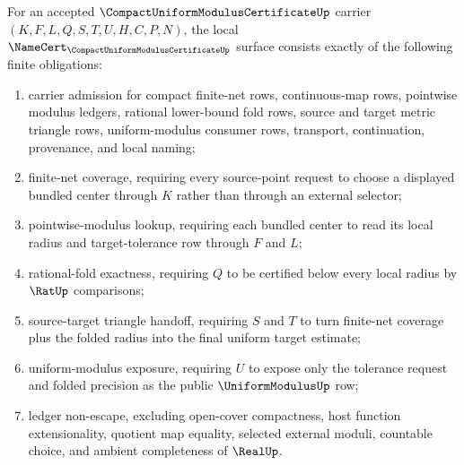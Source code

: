 \begin{theorem}
\label{thm:compact-modulus-fan-namecert-obligations}
For an accepted $\CompactUniformModulusCertificateUp$ carrier $(K,F,L,Q,S,T,U,H,C,P,N)$, the local $\NameCert_{\CompactUniformModulusCertificateUp}$ surface consists exactly of the following finite obligations:
\begin{enumerate}
\item carrier admission for compact finite-net rows, continuous-map rows, pointwise modulus ledgers, rational lower-bound fold rows, source and target metric triangle rows, uniform-modulus consumer rows, transport, continuation, provenance, and local naming;
\item finite-net coverage, requiring every source-point request to choose a displayed bundled center through $K$ rather than through an external selector;
\item pointwise-modulus lookup, requiring each bundled center to read its local radius and target-tolerance row through $F$ and $L$;
\item rational-fold exactness, requiring $Q$ to be certified below every local radius by $\RatUp$ comparisons;
\item source-target triangle handoff, requiring $S$ and $T$ to turn finite-net coverage plus the folded radius into the final uniform target estimate;
\item uniform-modulus exposure, requiring $U$ to expose only the tolerance request and folded precision as the public $\UniformModulusUp$ row;
\item ledger non-escape, excluding open-cover compactness, host function extensionality, quotient map equality, selected external moduli, countable choice, and ambient completeness of $\RealUp$.
\end{enumerate}
\end{theorem}
